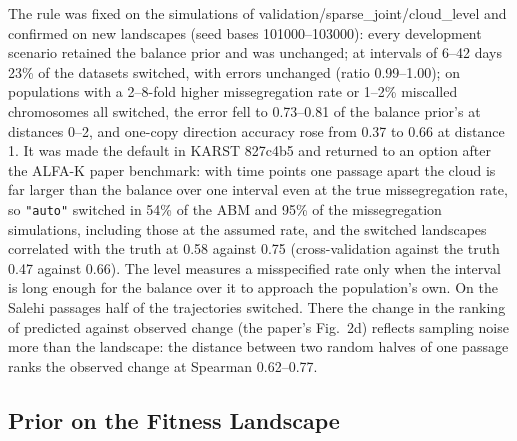 \documentclass[11pt]{article}
\begin{document}
The rule was fixed on the simulations of validation/sparse\_joint/cloud\_level
and confirmed on new landscapes (seed bases 101000--103000): every
development scenario retained the balance prior and was unchanged; at
intervals of 6--42 days 23\% of the datasets switched, with errors unchanged
(ratio 0.99--1.00); on populations with a 2--8-fold higher missegregation rate
or 1--2\% miscalled chromosomes all switched, the error fell to 0.73--0.81 of
the balance prior's at distances 0--2, and one-copy direction accuracy rose
from 0.37 to 0.66 at distance 1. It was made the default in KARST 827c4b5
and returned to an option after the ALFA-K paper benchmark: with time points one
passage apart the cloud is far larger than the balance over one interval even
at the true missegregation rate, so \texttt{"auto"} switched in 54\% of the ABM
and 95\% of the missegregation simulations, including those at the assumed
rate, and the switched landscapes correlated with the truth at 0.58 against
0.75 (cross-validation against the truth 0.47 against 0.66). The level
measures a misspecified rate only when the interval is long enough for the
balance over it to approach the population's own. On the Salehi passages half
of the trajectories switched. There the change in the ranking of predicted
against observed change (the paper's Fig.~2d) reflects sampling noise more
than the landscape: the distance between two random halves of one passage
ranks the observed change at Spearman 0.62--0.77.

\subsection{Prior on the Fitness Landscape}
\label{sec:sj-prior}
\end{document}
